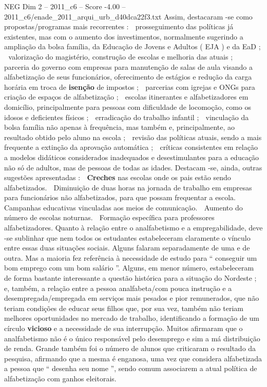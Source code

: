 \begin{textsample}{NEG Dim 2 – 2011\_c6 – Score -4.00 – 2011\_c6/enade\_2011\_arqui\_urb\_d40dca22f3.txt}
Assim, destacaram -se como propostas/programas mais recorrentes :  prosseguimento das políticas já existentes, mas com o aumento dos investimentos, normalmente sugerindo a ampliação da bolsa família, da Educação de Jovens e Adultos ( EJA ) e da EaD ;  valorização do magistério, construção de escolas e melhoria das atuais ;  parceria do governo com empresas para manutenção de salas de aula visando a alfabetização de seus funcionários, oferecimento de estágios e redução da carga horária em troca de \textbf{isenção} de impostos ;  parcerias com igrejas e ONGs para criação de espaços de alfabetização ;  escolas itinerantes e alfabetizadores em domicílio, principalmente para pessoas com dificuldade de locomoção, como os idosos e deficientes físicos ;  erradicação do trabalho infantil ;  vinculação da bolsa família não apenas à frequência, mas também e, principalmente, ao resultado obtido pelo aluno na escola ;  revisão das políticas atuais, sendo a mais frequente a extinção da aprovação automática ;  críticas consistentes em relação a modelos didáticos considerados inadequados e desestimulantes para a educação não só de adultos, mas de pessoas de todas as idades.
Destacam -se, ainda, outras sugestões apresentadas :  \textbf{Creches} nas escolas onde os pais estão sendo alfabetizados.  Diminuição de duas horas na jornada de trabalho em empresas para funcionários não alfabetizados, para que possam frequentar a escola.  Campanhas educativas vinculadas aos meios de comunicação.  Aumento do número de escolas noturnas.  Formação específica para professores alfabetizadores.
Quanto à relação entre o analfabetismo e a empregabilidade, deve -se sublinhar que nem todos os estudantes estabeleceram claramente o vínculo entre essas duas situações sociais.
Alguns falaram separadamente de uma e de outra.
Mas a maioria fez referência à necessidade de estudo para “ conseguir um bom emprego com um bom salário ”.
Alguns, em menor número, estabeleceram de forma bastante interessante a questão histórica para a situação do Nordeste ; e, também, a relação entre a pessoa analfabeta/com pouca instrução e a desempregada/empregada em serviços mais pesados e pior remunerados, que não teriam condições de educar seus filhos que, por sua vez, também não teriam melhores oportunidades no mercado de trabalho, identificando a formação de um círculo \textbf{vicioso} e a necessidade de sua interrupção.
Muitos afirmaram que o analfabetismo não é o único responsável pelo desemprego e sim a má distribuição de renda.
Grande também foi o número de alunos que criticaram o resultado da pesquisa, afirmando que a mesma é enganosa, uma vez que considera alfabetizada a pessoa que “ desenha seu nome ”, sendo comum associarem a atual política de alfabetização com ganhos eleitorais.

\end{textsample}
